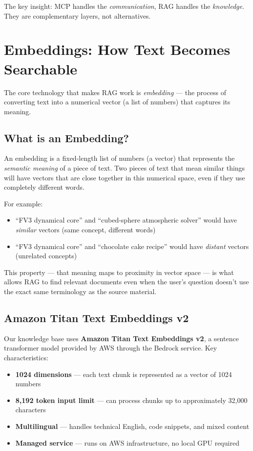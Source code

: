 \documentclass[11pt,letterpaper]{article}
\begin{document}
The key insight: MCP handles the \emph{communication}, RAG handles
the \emph{knowledge}. They are complementary layers, not alternatives.

\section{Embeddings: How Text Becomes Searchable}

The core technology that makes RAG work is \emph{embedding} — the
process of converting text into a numerical vector (a list of numbers)
that captures its meaning.

\subsection{What is an Embedding?}

An embedding is a fixed-length list of numbers (a vector) that
represents the \emph{semantic meaning} of a piece of text. Two pieces
of text that mean similar things will have vectors that are close
together in this numerical space, even if they use completely different
words.

For example:
\begin{itemize}[nosep]
    \item ``FV3 dynamical core'' and ``cubed-sphere atmospheric solver''
    would have \emph{similar} vectors (same concept, different words)
    \item ``FV3 dynamical core'' and ``chocolate cake recipe'' would
    have \emph{distant} vectors (unrelated concepts)
\end{itemize}

This property — that meaning maps to proximity in vector space — is
what allows RAG to find relevant documents even when the user's
question doesn't use the exact same terminology as the source material.

\subsection{Amazon Titan Text Embeddings v2}

Our knowledge base uses \textbf{Amazon Titan Text Embeddings v2}, a
sentence transformer model provided by AWS through the Bedrock service.
Key characteristics:

\begin{itemize}[nosep]
    \item \textbf{1024 dimensions} — each text chunk is represented as
    a vector of 1024 numbers
    \item \textbf{8,192 token input limit} — can process chunks up to
    approximately 32,000 characters
    \item \textbf{Multilingual} — handles technical English, code
    snippets, and mixed content
    \item \textbf{Managed service} — runs on AWS infrastructure, no
    local GPU required
\end{itemize}
\end{document}
